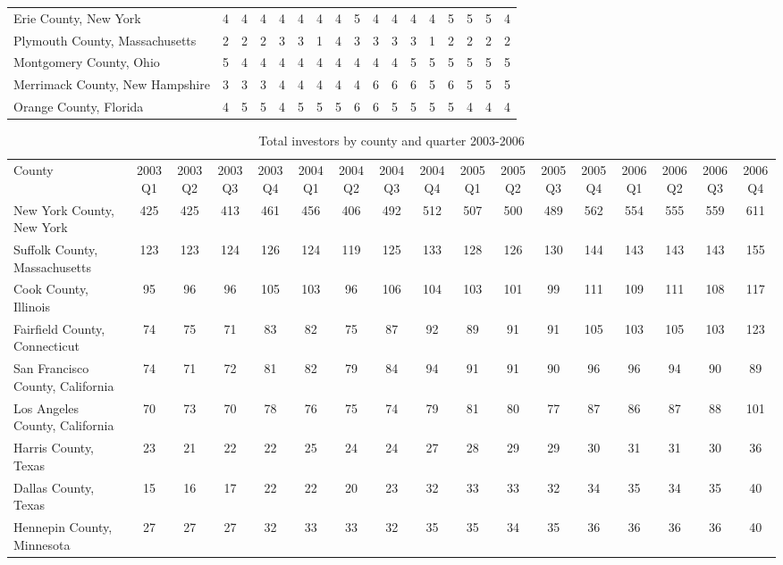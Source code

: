 \begin{landscape}
\begin{longtable}{lcccccccccccccccc}
	Erie County, New York & 4 & 4 & 4 & 4 & 4 & 4 & 4 & 5 & 4 & 4 & 4 & 4 & 5 & 5 & 5 & 4 \\
	Plymouth County, Massachusetts & 2 & 2 & 2 & 3 & 3 & 1 & 4 & 3 & 3 & 3 & 3 & 1 & 2 & 2 & 2 & 2 \\
	Montgomery County, Ohio & 5 & 4 & 4 & 4 & 4 & 4 & 4 & 4 & 4 & 4 & 5 & 5 & 5 & 5 & 5 & 5 \\
	Merrimack County, New Hampshire & 3 & 3 & 3 & 4 & 4 & 4 & 4 & 4 & 6 & 6 & 6 & 5 & 6 & 5 & 5 & 5 \\
	Orange County, Florida & 4 & 5 & 5 & 4 & 5 & 5 & 5 & 6 & 6 & 5 & 5 & 5 & 5 & 4 & 4 & 4
	\end{longtable}


\newpage


	\begin{longtable}{lcccccccccccccccc}
		\caption[Total Investors by County and Quarter 2003-2006]{Total investors by county and quarter 2003-2006} \\
	County &2003Q1 &2003Q2 &2003Q3 &2003Q4 &2004Q1 &2004Q2 &2004Q3 &2004Q4 &2005Q1 & 2005Q2 &2005Q3 &2005Q4 &2006Q1 &2006Q2 &2006Q3 & 2006Q4 \\
		New York County, New York & 425 & 425 & 413 & 461 & 456 & 406 & 492 & 512 & 507 & 500 & 489 & 562 & 554 & 555 & 559 & 611 \\
		Suffolk County, Massachusetts & 123 & 123 & 124 & 126 & 124 & 119 & 125 & 133 & 128 & 126 & 130 & 144 & 143 & 143 & 143 & 155 \\
		Cook County, Illinois & 95 & 96 & 96 & 105 & 103 & 96 & 106 & 104 & 103 & 101 & 99 & 111 & 109 & 111 & 108 & 117 \\
		Fairfield County, Connecticut & 74 & 75 & 71 & 83 & 82 & 75 & 87 & 92 & 89 & 91 & 91 & 105 & 103 & 105 & 103 & 123 \\
		San Francisco County, California & 74 & 71 & 72 & 81 & 82 & 79 & 84 & 94 & 91 & 91 & 90 & 96 & 96 & 94 & 90 & 89 \\
		Los Angeles County, California & 70 & 73 & 70 & 78 & 76 & 75 & 74 & 79 & 81 & 80 & 77 & 87 & 86 & 87 & 88 & 101 \\
		Harris County, Texas & 23 & 21 & 22 & 22 & 25 & 24 & 24 & 27 & 28 & 29 & 29 & 30 & 31 & 31 & 30 & 36 \\
		Dallas County, Texas & 15 & 16 & 17 & 22 & 22 & 20 & 23 & 32 & 33 & 33 & 32 & 34 & 35 & 34 & 35 & 40 \\
		Hennepin County, Minnesota & 27 & 27 & 27 & 32 & 33 & 33 & 32 & 35 & 35 & 34 & 35 & 36 & 36 & 36 & 36 & 40 \\

\end{longtable}
\end{landscape}
